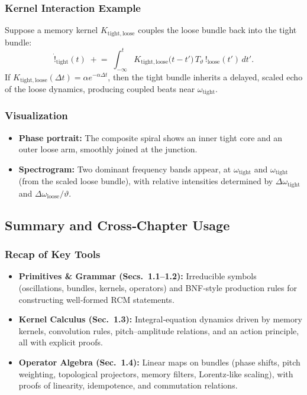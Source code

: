 \subsubsection{Kernel Interaction Example}

Suppose a memory kernel $K_{\mathrm{tight,loose}}$ couples the loose bundle back into the tight bundle:
\begin{equation}
\label{eq:3-10}

  \dot{!}_{\mathrm{tight}}(t)
  \;+\!=\;
  \int_{-\infty}^{t}
    K_{\mathrm{tight,loose}}\bigl(t-t'\bigr)\,
    T_{\vartheta}\,!_{\mathrm{loose}}(t')\,dt'.
\end{equation}
If $K_{\mathrm{tight,loose}}(\Delta t)=\alpha e^{-\alpha\Delta t}$, then the tight bundle inherits a delayed, scaled echo of the loose dynamics, producing coupled beats near $\omega_{\mathrm{tight}}$.

\subsubsection{Visualization}

\begin{itemize}
  \item \textbf{Phase portrait:} The composite spiral shows an inner tight core and an outer loose arm, smoothly joined at the junction.
  \item \textbf{Spectrogram:} Two dominant frequency bands appear, at $\omega_{\mathrm{tight}}$ and $\omega_{\mathrm{tight}}$ (from the scaled loose bundle), with relative intensities determined by $\Delta\omega_{\mathrm{tight}}$ and $\Delta\omega_{\mathrm{loose}}/\vartheta$.
\end{itemize}
\subsection{Summary and Cross‐Chapter Usage}
\label{subsec3:summary-and-cross-chapter-usage}

\subsubsection{Recap of Key Tools}
\begin{itemize}
  \item \textbf{Primitives \& Grammar (Secs.\ 1.1–1.2):}  
    Irreducible symbols (oscillations, bundles, kernels, operators) and BNF‐style production rules for constructing well‐formed RCM statements.
  \item \textbf{Kernel Calculus (Sec.\ 1.3):}  
    Integral‐equation dynamics driven by memory kernels, convolution rules, pitch–amplitude relations, and an action principle, all with explicit proofs.
  \item \textbf{Operator Algebra (Sec.\ 1.4):}  
    Linear maps on bundles (phase shifts, pitch weighting, topological projectors, memory filters, Lorentz‐like scaling), with proofs of linearity, idempotence, and commutation relations.
\end{itemize}

